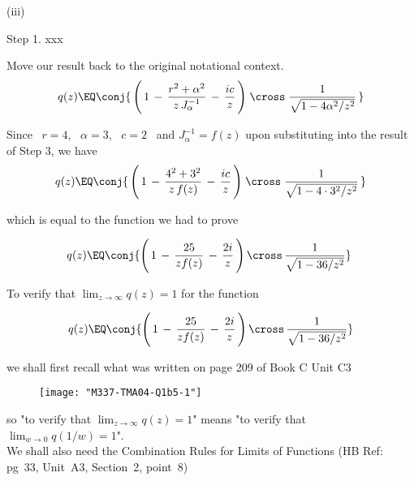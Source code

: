 \documentclass[english,a4paper,11pt]{scrartcl}
\begin{document}
\begin{labeling}{(iii) }
\begin{labeling}{Step 1. xxx }
\bigskip
\item [Step 3.] Move our result back to the original notational context.\\

\[   q(z)  \EQ  \conj{\, \Bigg(\, 1 \,-\, \frac{ r^2 + \alpha^2}{z\, J_\alpha^{-1}} \,-\, \frac{ic}{z}  \,\Bigg)  \; \cross \; \frac{1}{\sqrt{1 - 4\alpha^2/z^2} } \, } \]

\end{labeling}

\newpage
Since \, $r = 4$, \, $\alpha = 3$, \, $c = 2$ \, and $J_\alpha^{-1} = f(z)$ upon substituting into the result of Step 3,  we have \\

\[   q(z)  \EQ  \conj{\, \Bigg(\, 1 \,-\, \frac{ 4^2 + 3^2}{z\, f(z)} \,-\, \frac{ic}{z}  \,\Bigg)  \; \cross \; \frac{1}{\sqrt{1 - 4 \cdot 3^2/z^2} } \, } \]

\bigskip
which is equal to the function we had to prove \\

\bigskip
\begin{Answer}
\[ \quad q(z) \EQ \conj{\Bigg(\,  1 \,-\, \frac{25}{z f(z)} \,-\, \frac{2i}{z} \,\Bigg) \, \cross \, \frac1{\sqrt{1 - 36/z^2}} }  \quad ~\]
\end{Answer}





  
\newpage
  \item [(v)] To verify that $\displaystyle \lim_{z\to\infty} q(z) = 1$ for the function 

\[  q(z) \EQ \conj{\Bigg(\,  1 \,-\, \frac{25}{z f(z)} \,-\, \frac{2i}{z} \,\Bigg) \, \cross \, \frac1{\sqrt{1 - 36/z^2}} }  \]

\bigskip
we shall first recall what was written on page 209 of Book C Unit C3\\

\bigskip
\begin{figure}[H]
	\centering
	\texttt{[image: "M337-TMA04-Q1b5-1"]}
\end{figure}

\bigskip
so "to verify that $\displaystyle \lim_{z\to\infty} q(z) = 1$" means "to verify that $\displaystyle \lim_{w\to 0} q(1/w) = 1$".\\

\bigskip
We shall also need the Combination Rules for Limits of Functions (HB Ref: pg~33, Unit~A3, Section~2, point~8) \\


\end{labeling}
\end{document}
